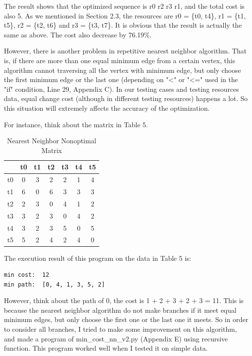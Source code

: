 \documentclass[12pt,a4paper]{article}
\begin{document}
The result shows that the optimized sequence is r0 \textrightarrow r2 \textrightarrow r3 \textrightarrow r1, and the total cost is also 5. As we mentioned in Section 2.3, the resources are r0 = \{t0, t4\}, r1 = \{t1, t5\}, r2 = \{t2, t6\} and r3 = \{t3, t7\}. It is obvious that the result is actually the same as above. The cost also decrease by 76.19\%.

However, there is another problem in repetitive nearest neighbor algorithm. That is, if there are more than one equal minimum edge from a certain vertex, this algorithm cannot traversing all the vertex with minimum edge, but only choose the first minimum edge or the last one (depending on "\textless" or "\textless=" used in the "if" condition, Line 29, Appendix C). In our testing cases and testing resources data, equal change cost (although in different testing resources) happens a lot. So this situation will extremely affects the accuracy of the optimization. 

For instance, think about the matrix in Table 5. 

\begin{table}[htbp]
\centering
\caption{Nearest Neighbor Nonoptimal Matrix}
\begin{tabular}{|c|cccccc|}\hline
	 & t0 & t1 & t2 & t3 & t4 & t5 \\\hline
	t0 & 0 & 3 & 2 & 2 & 1 & 4\\
	t1 & 6 & 0 & 6 & 3 & 3 & 3\\
	t2 & 2 & 3 & 0 & 4 & 1 & 2\\
	t3 & 3 & 2 & 3 & 0 & 4 & 2\\
	t4 & 3 & 2 & 3 & 5 & 0 & 5\\
	t5 & 5 & 2 & 4 & 2 & 4 & 0\\\hline
\end{tabular}
\end{table}

The execution result of this program on the data in Table 5 is:

\begin{lstlisting}
min cost:  12
min path:  [0, 4, 1, 3, 5, 2]
\end{lstlisting}

However, think about the path of 0, the cost is 1 + 2 + 3 + 2 + 3 = 11. This is because the nearest neighbor algorithm do not make branches if it meet equal minimum edges, but only choose the first one or the last one it meets. So in order to consider all branches, I tried to make some improvement on this algorithm, and made a program of min\_cost\_nn\_v2.py (Appendix E) using recursive function. This program worked well when I tested it on simple data.
\end{document}
